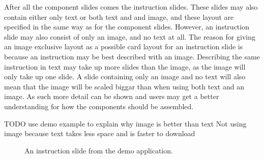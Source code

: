 After all the component slides comes the instruction slides. These slides may also contain either only text or both text and and image, and these layout are specified in the same way as for the component slides. However, an instruction slide may also consist of only an image, and no text at all. The reason for giving an image exclusive layout as a possible card layout for an instruction slide is because an instruction may be best described with an image. Describing the same instruction in text may take up more slides than the image, as the image will only take up one slide. A slide containing only an image and no text will also mean that the image will be scaled biggar than when using both text and an image. As such more detail can be shown and users may get a better understanding for how the components should be assembled.

TODO use demo example to explain why image is better than text Not using image because text takes less space and is faster to download

	\begin{figure}[ht!]
		\centering
   		 \qquad
   		 \qquad
		\caption{An instruction slide from the demo application.}
		\label{glassDemoInstructionImage}
	\end{figure}
	
